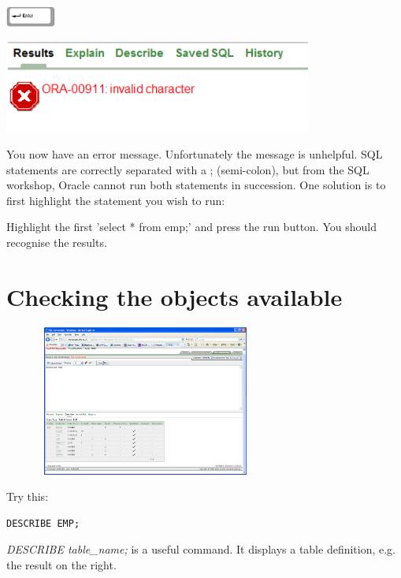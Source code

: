\includegraphics[width=1.63cm,height=0.683cm]{images/img (8).png}

\begin{center}

\includegraphics[width=10.137cm,height=3.044cm]{images/img (11).png}

\end{center}

You now have an error message.  Unfortunately the message is unhelpful. SQL statements are correctly separated with a ; (semi-colon), but  from the SQL workshop, Oracle cannot run both statements in succession. One solution is to first highlight the statement you wish to run:

Highlight the first 'select * from emp;' and press the run button.  You should recognise the results.

\section{Checking the objects available}

\begin{center}
\includegraphics[width=9.35cm,height=4.944cm]{images/img (12).png}
\end{center}

Try this:

\begin{lstlisting}
DESCRIBE EMP;
\end{lstlisting}

\emph{DESCRIBE table\_name;} is a useful command. It displays a table definition, e.g. the result on the right.

